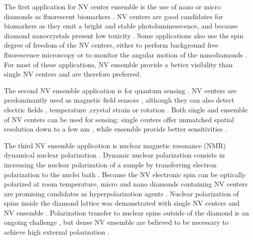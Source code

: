 \documentclass[a4paper, 11pt]{book}
\begin{document}
The first application for NV center ensemble is the use of nano or micro diamonds as fluorescent biomarkers \citep{fu2007characterization, mohan2010vivo}. NV centers are good candidates for biomarkers as they emit a bright and stable photoluminesecence, and because diamond nanocrystals present low toxicity \citep{schirhagl2014nitrogen}. Some applications also use the spin degree of freedom of the NV centers, either to perform background free fluorescence microscopy \citep{chapman2013background} or to monitor the angular motion of the nanodiamonds \citep{mcguinness2011quantum, feng2021association}. For most of these applications, NV ensemble provide a better visibility than single NV centers and are therefore preferred.

The second NV ensemble application is for quantum sensing \citep{degen2017quantum}. NV centers are predominantly used as magnetic field sensors \citep{rondin2014magnetometry, barry2020sensitivity}, although they can also detect electric fields \citep{dolde2011electric, michl2019robust}, temperature \citep{acosta2010temperature, kucsko2013nanometre} ,crystal strain \citep{ovartchaiyapong2014dynamic, doherty2014electronic} or rotation \citep{ledbetter2012gyroscopes, ajoy2012stable}. Both single and ensemble of NV centers can be used for sensing: single centers offer unmatched spatial resolution \citep{mitchell2020colloquium} down to a few nm \citep{lovchinsky2016nuclear}, while ensemble provide better sensitivities \citep{wolf2015subpicotesla, barry2020sensitivity}. 

The third NV ensemble application is nuclear magnetic resonance (NMR) dynamical nuclear polarization \citep{eills2022spin}. Dynamic nuclear polarization consists in increasing the nuclear polarization of a sample by transferring electron polarization to the nuclei bath \citep{abragam1978principles}. Because the NV electronic spin can be optically polarized at room temperature, micro and nano diamonds containing NV centers are promising candidates as hyperpolarization agents \citep{tetienne2021prospects}. Nuclear polarization of spins inside the diamond lattice was demonstrated with single NV centers \citep{jacques2009dynamic, smeltzer2009robust} and NV ensemble \citep{king2015room, scheuer2016optically, schwartz2018robust}. Polarization transfer to nuclear spins outside of the diamond is an ongoing challenge \citep{eills2022spin, healey2021polarization}, but dense NV ensemble are believed to be necessary to achieve high external polarization \citep{tetienne2021prospects, rizzato2022polarization}.
\end{document}
